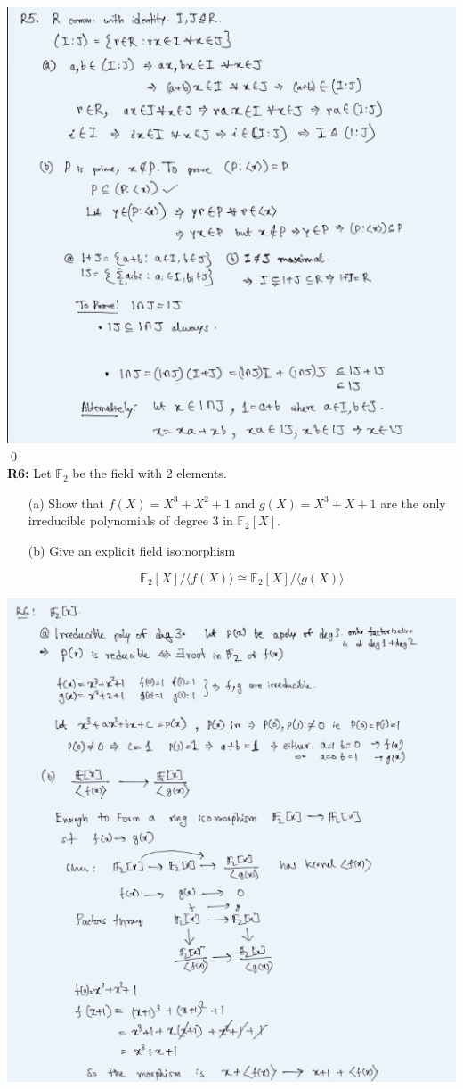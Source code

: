 \includegraphics{R2.5.png}
\qed\\
\textbf{R6:} Let $\mathbb{F}_{2}$ be the field with 2 elements.
\begin{itemize}
	\item[(a)] Show that $f(X)=X^{3}+X^{2}+1$ and $g(X)=X^{3}+X+1$ are the only irreducible polynomials of degree 3 in $\mathbb{F}_{2}[X]$.
	\item[(b)] Give an explicit field isomorphism

$$
\mathbb{F}_{2}[X] /\langle f(X)\rangle \cong \mathbb{F}_{2}[X] /\langle g(X)\rangle
$$
\end{itemize}
\soln
\includegraphics{R2.6.png}
